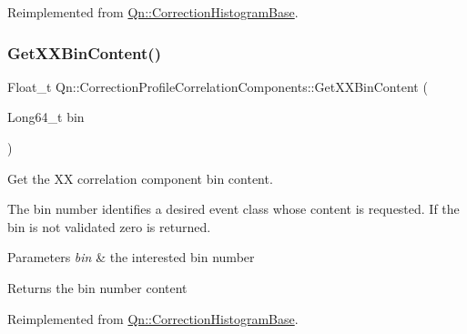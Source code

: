 Reimplemented from \mbox{\hyperlink{classQn_1_1CorrectionHistogramBase_ab1f64550f4e1812864da6f9f6ea565e6}{Qn\+::\+Correction\+Histogram\+Base}}.

\mbox{\label{classQn_1_1CorrectionProfileCorrelationComponents_a8bb785420ac0cb117b2af1047cb86bb2}} 
\subsubsection{\texorpdfstring{Get\+X\+X\+Bin\+Content()}{GetXXBinContent()}}
{\footnotesize\ttfamily Float\+\_\+t Qn\+::\+Correction\+Profile\+Correlation\+Components\+::\+Get\+X\+X\+Bin\+Content (\begin{DoxyParamCaption}\item[{Long64\+\_\+t}]{bin }\end{DoxyParamCaption})\hspace{0.3cm}{\ttfamily [virtual]}}

Get the XX correlation component bin content.

The bin number identifies a desired event class whose content is requested. If the bin is not validated zero is returned.


\begin{DoxyParams}{Parameters}
{\em bin} & the interested bin number \\
\hline
\end{DoxyParams}
\begin{DoxyReturn}{Returns}
the bin number content 
\end{DoxyReturn}


Reimplemented from \mbox{\hyperlink{classQn_1_1CorrectionHistogramBase_a5ed53d98b57fa9e9ec4de78ae518d9d9}{Qn\+::\+Correction\+Histogram\+Base}}.

\mbox{\label{classQn_1_1CorrectionProfileCorrelationComponents_a76bba719fcab0995255c8309dcaf6c72}} 

